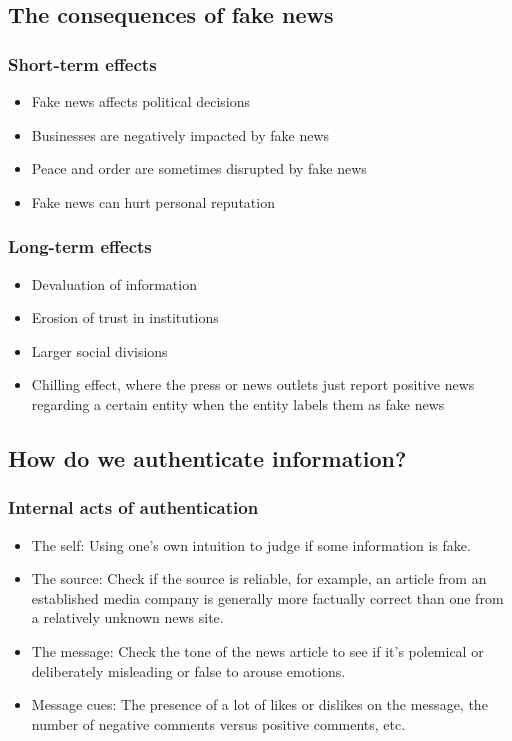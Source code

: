 \documentclass[11pt]{article}
\begin{document}
\clearpage
\subsection{The consequences of fake news}
\label{sec:orgc67a3e7}

\subsubsection{Short-term effects}
\label{sec:orgaec0489}
\begin{itemize}
\item Fake news affects political decisions
\item Businesses are negatively impacted by fake news
\item Peace and order are sometimes disrupted by fake news
\item Fake news can hurt personal reputation
\end{itemize}
\subsubsection{Long-term effects}
\label{sec:org9b9b228}
\begin{itemize}
\item Devaluation of information
\item Erosion of trust in institutions
\item Larger social divisions
\item Chilling effect, where the press or news outlets just report positive news regarding a certain entity when the entity labels them as fake news
\end{itemize}

\clearpage
\subsection{How do we authenticate information?}
\label{sec:org2d3d35e}

\subsubsection{Internal acts of authentication}
\label{sec:org6e44eb8}
\begin{itemize}
\item The self: Using one's own intuition to judge if some information is fake.
\item The source: Check if the source is reliable, for example, an article from an established media company is generally more factually correct than one from a relatively unknown news site.
\item The message: Check the tone of the news article to see if it's polemical or deliberately misleading or false to arouse emotions.
\item Message cues: The presence of a lot of likes or dislikes on the message, the number of negative comments versus positive comments, etc.
\end{itemize}
\end{document}

